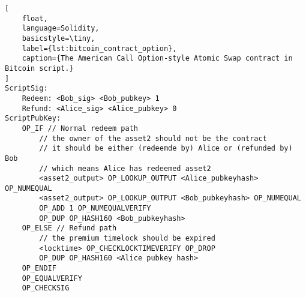 \begin{lstlisting}[
    float,
    language=Solidity, 
    basicstyle=\tiny,
    label={lst:bitcoin_contract_option},
    caption={The American Call Option-style Atomic Swap contract in Bitcoin script.}
]
ScriptSig:
    Redeem: <Bob_sig> <Bob_pubkey> 1
    Refund: <Alice_sig> <Alice_pubkey> 0
ScriptPubKey:
    OP_IF // Normal redeem path
        // the owner of the asset2 should not be the contract
        // it should be either (redeemde by) Alice or (refunded by) Bob
        // which means Alice has redeemed asset2
        <asset2_output> OP_LOOKUP_OUTPUT <Alice_pubkeyhash> OP_NUMEQUAL
        <asset2_output> OP_LOOKUP_OUTPUT <Bob_pubkeyhash> OP_NUMEQUAL
        OP_ADD 1 OP_NUMEQUALVERIFY
        OP_DUP OP_HASH160 <Bob_pubkeyhash>
    OP_ELSE // Refund path
        // the premium timelock should be expired
        <locktime> OP_CHECKLOCKTIMEVERIFY OP_DROP
        OP_DUP OP_HASH160 <Alice pubkey hash>
    OP_ENDIF
    OP_EQUALVERIFY
    OP_CHECKSIG
\end{lstlisting}


